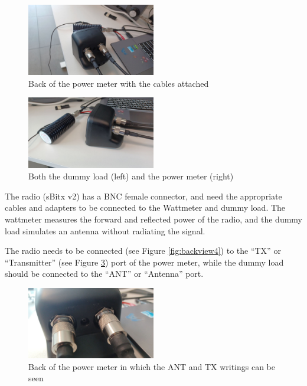 \documentclass[11pt,a4paper]{article}
\begin{document}
\begin{figure}[!ht]
  \centering
  \includegraphics[width=0.5\textwidth]{pictures/wattmeter_1.jpeg}
  \caption{Back of the power meter with the cables attached}
  \label{fig:backview1}
\end{figure}

\begin{figure}[!ht]
  \centering
  \includegraphics[width=0.5\textwidth]{pictures/wattmeter_3.jpeg}
  \caption{Both the dummy load (left) and the power meter (right)}
  \label{fig:backview3}
\end{figure}


The radio (sBitx v2) has a BNC female connector, and need the appropriate cables and adapters to
be connected to the Wattmeter and dummy load. The wattmeter measures the forward and reflected power of the radio,
and the dummy load simulates an antenna without radiating the signal.

The radio needs to be connected (see Figure \ref{fig:backview4}) to the ``TX'' or ``Transmitter'' (see Figure \ref{fig:backview2}) port of the power meter, while the dummy load
should be connected to the ``ANT'' or ``Antenna'' port.

\begin{figure}[!ht]
  \centering
  \includegraphics[width=0.5\textwidth]{pictures/wattmeter_2.jpeg}
  \caption{Back of the power meter in which the ANT and TX writings can be seen}
  \label{fig:backview2}
\end{figure}
\end{document}
